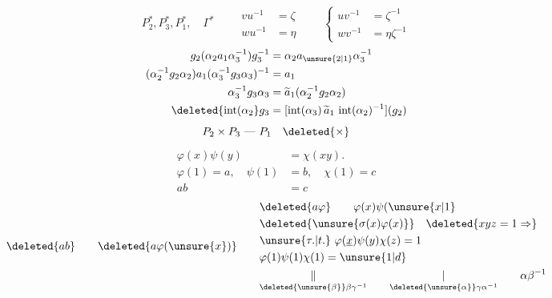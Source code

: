 \[
 P_2^{*},P_3^{*},P_1^{*},\quad \Gamma^{*}\qquad
 \begin{aligned}
 vu^{-1}&=\zeta\\wu^{-1}&=\eta
 \end{aligned}
 \qquad
 \left\{\begin{aligned}uv^{-1}&=\zeta^{-1}\\wv^{-1}&=\eta\zeta^{-1}\end{aligned}\right.
\]
\[
\begin{aligned}
 g_2(\alpha_2a_1\alpha_3^{-1})g_3^{-1}&=\alpha_2a_{\unsure{2|1}}\alpha_3^{-1}\\
 (\alpha_2^{-1}g_2\alpha_2)a_1(\alpha_3^{-1}g_3\alpha_3)^{-1}&=a_1\\
 \alpha_3^{-1}g_3\alpha_3&=\widetilde a_1(\alpha_2^{-1}g_2\alpha_2)\\
 \deleted{\operatorname{int}(\alpha_2}g_3&=[\operatorname{int}(\alpha_3)\,\widetilde a_1\,\operatorname{int}(\alpha_2)^{-1}](g_2)
\end{aligned}
\]
\[
 P_2\times P_3\ \text{---}\ P_1\quad\deleted{\times}
\]
\[
\begin{aligned}
 \varphi(x)\psi(y)&=\chi(xy).\\
 \varphi(1)=a,\quad \psi(1)&=b,\quad \chi(1)=c\\
 ab&=c
\end{aligned}
\]
\[
 \deleted{ab}\qquad\deleted{a\varphi(\unsure{x})}\qquad
 \begin{aligned}
 &\deleted{a\varphi}\qquad \varphi(x)\psi(\unsure{x|1}\\
 &\deleted{\unsure{\sigma(x)\varphi(x)}}\quad \deleted{xyz=1\Rightarrow}\\
 &\unsure{\tau.|t.}\ \varphi(\underline{x})\psi(y)\chi(z)=1\\
 &\varphi(1)\psi(1)\chi(1)=\unsure{1|d}\\
 &\underset{\deleted{\unsure{\beta}}\beta\gamma^{-1}}{\Vert}\qquad\underset{\deleted{\unsure{\alpha}}\gamma\alpha^{-1}}{|}\qquad \alpha\beta^{-1}
 \end{aligned}
\]

